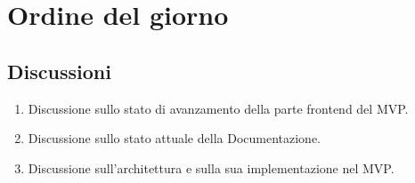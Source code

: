 \section{Ordine del giorno} \label{sec:agenda}
\subsection{Discussioni} \label{subsec:discussione}
\begin{enumerate}
    \item Discussione sullo stato di avanzamento della parte frontend del MVP.
    \item Discussione sullo stato attuale della Documentazione.
    \item Discussione sull'architettura e sulla sua implementazione nel MVP.
\end{enumerate}

